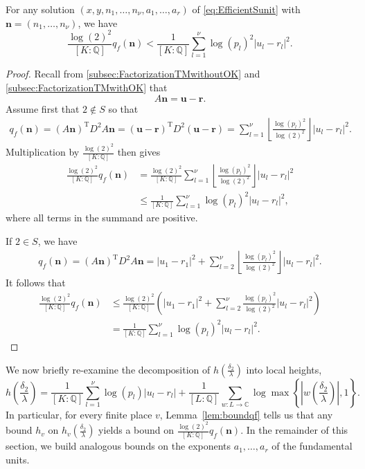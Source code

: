 \begin{lemma} \label{lem:boundqf}
For any solution $(x,y, n_1, \dots, n_{\nu}, a_1, \dots, a_r)$ of \eqref{eq:EfficientSunit} with $\mathbf{n} = (n_1, \dots, n_{\nu})$, we have 
\[\frac{\log(2)^2}{[K:\mathbb{Q}]}q_f(\mathbf{n}) < \frac{1}{[K:\mathbb{Q}]}\sum_{l = 1}^{\nu}\log(p_l)^2|u_l -r_l|^2.\] 
\end{lemma}

\begin{proof}
Recall from \autoref{subsec:FactorizationTMwithoutOK} and \autoref{subsec:FactorizationTMwithOK} that
\[A\mathbf{n} = \mathbf{u} - \mathbf{r}.\]
Assume first that $2 \notin S$ so that
\begin{align*}
q_f(\mathbf{n})	
	 = (A\mathbf{n})^{\text{T}}D^2A\mathbf{n}
	 = (\mathbf{u} - \mathbf{r})^{\text{T}}D^2(\mathbf{u} - \mathbf{r})
	 = \sum_{l = 1}^{\nu}\left\lfloor\frac{\log(p_l)^2}{\log(2)^2}\right\rfloor|u_l-r_l|^2.
\end{align*}
Multiplication by $\frac{\log(2)^2}{[K:\mathbb{Q}]}$ then gives
\begin{align*}
\frac{\log(2)^2}{[K:\mathbb{Q}]}q_f(\mathbf{n})  
	& = \frac{\log(2)^2}{[K:\mathbb{Q}]}\sum_{l = 1}^{\nu} \left\lfloor\frac{\log(p_l)^2}{\log(2)^2}\right\rfloor|u_l -r_l|^2 \\
 	& \leq \frac{1}{[K:\mathbb{Q}]}\sum_{l = 1}^{\nu}\log(p_l)^2|u_l -r_l|^2,
\end{align*}
where all terms in the summand are positive. 

If $2 \in S$, we have
\begin{align*}
q_f(\mathbf{n})	
	 = (A\mathbf{n})^{\text{T}}D^2A\mathbf{n}
	 = |u_1 - r_1|^2 + \sum_{l = 2}^{\nu}\left\lfloor\frac{\log(p_l)^2}{\log(2)^2}\right\rfloor|u_l-r_l|^2.
\end{align*}
It follows that
\begin{align*}
\frac{\log(2)^2}{[K:\mathbb{Q}]}q_f(\mathbf{n}) 
	& \leq \frac{\log(2)^2}{[K:\mathbb{Q}]}\left( |u_1 - r_1|^2 + \sum_{l = 2}^{\nu} \frac{\log(p_l)^2}{\log(2)^2}|u_l -r_l|^2\right) \\
	& = \frac{1}{[K:\mathbb{Q}]}\sum_{l = 1}^{\nu}\log(p_l)^2|u_l -r_l|^2.
\end{align*}
\end{proof}

We now briefly re-examine the decomposition of $h\left(\frac{\delta_2}{\lambda}\right)$ into local heights, 
\[h\left(\frac{\delta_2}{\lambda}\right) = \frac{1}{[K:\mathbb{Q}]}\sum_{l = 1}^{\nu} \log(p_l)|u_l - r_l| + \frac{1}{[L:\mathbb{Q}]}\sum_{w :L \to \mathbb{C}} \log \max \left\{ \left|w\left(\frac{\delta_2}{\lambda}\right)\right|, 1\right\}.\]
In particular, for every finite place $v$, Lemma~\ref{lem:boundqf} tells us that any bound $h_v$ on $h_v\left(\frac{\delta_2}{\lambda}\right)$ yields a bound on $\frac{\log(2)^2}{[K:\mathbb{Q}]}q_f(\mathbf{n})$. In the remainder of this section, we build analogous bounds on the exponents $a_1, \dots, a_r$ of the fundamental units. 

